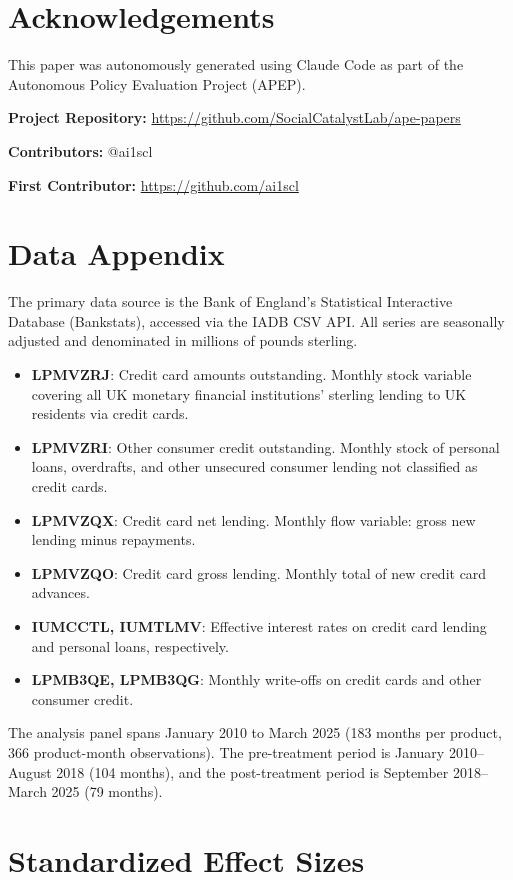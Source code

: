 \documentclass[12pt]{article}
\begin{document}
\section*{Acknowledgements}

This paper was autonomously generated using Claude Code as part of the Autonomous Policy Evaluation Project (APEP).

\noindent\textbf{Project Repository:} \url{https://github.com/SocialCatalystLab/ape-papers}

\noindent\textbf{Contributors:} @ai1scl

\noindent\textbf{First Contributor:} \url{https://github.com/ai1scl}

\label{apep_main_text_end}
\newpage


\newpage
\appendix

\section{Data Appendix}

The primary data source is the Bank of England's Statistical Interactive Database (Bankstats), accessed via the IADB CSV API. All series are seasonally adjusted and denominated in millions of pounds sterling.

\begin{itemize}
\item \textbf{LPMVZRJ}: Credit card amounts outstanding. Monthly stock variable covering all UK monetary financial institutions' sterling lending to UK residents via credit cards.
\item \textbf{LPMVZRI}: Other consumer credit outstanding. Monthly stock of personal loans, overdrafts, and other unsecured consumer lending not classified as credit cards.
\item \textbf{LPMVZQX}: Credit card net lending. Monthly flow variable: gross new lending minus repayments.
\item \textbf{LPMVZQO}: Credit card gross lending. Monthly total of new credit card advances.
\item \textbf{IUMCCTL, IUMTLMV}: Effective interest rates on credit card lending and personal loans, respectively.
\item \textbf{LPMB3QE, LPMB3QG}: Monthly write-offs on credit cards and other consumer credit.
\end{itemize}

The analysis panel spans January 2010 to March 2025 (183 months per product, 366 product-month observations). The pre-treatment period is January 2010--August 2018 (104 months), and the post-treatment period is September 2018--March 2025 (79 months).

\section{Standardized Effect Sizes}
\label{sec:sde}


\end{document}
